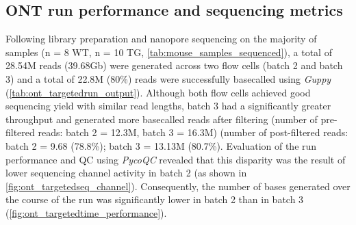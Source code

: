 \newpage
\subsection{ONT run performance and sequencing metrics}
\label{ch6: ont_run_performance}
Following library preparation and nanopore sequencing on the majority of samples (n = 8 WT, n = 10 TG, \cref{tab:mouse_samples_sequenced}), a total of 28.54M reads (39.68Gb) were generated across two flow cells (batch 2 and batch 3) and a total of 22.8M (80\%) reads were successfully basecalled using \textit{Guppy} (\cref{tab:ont_targetedrun_output}). Although both flow cells achieved good sequencing yield with similar read lengths, batch 3 had a significantly greater throughput and generated more basecalled reads after filtering (number of pre-filtered reads: batch 2 = 12.3M,  batch 3 = 16.3M) (number of post-filtered reads: batch 2 = 9.68 (78.8\%); batch 3 = 13.13M (80.7\%). Evaluation of the run performance and QC using \textit{PycoQC} revealed that this disparity was the result of lower sequencing channel activity in batch 2 (as shown in \cref{fig:ont_targetedseq_channel}). Consequently, the number of bases generated over the course of the run was significantly lower in batch 2 than in batch 3 (\cref{fig:ont_targetedtime_performance}).  


